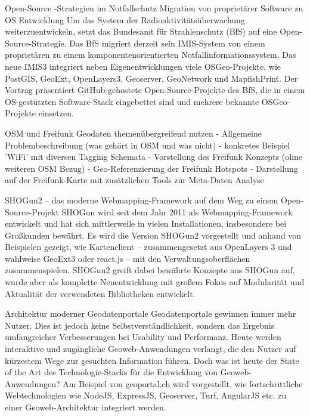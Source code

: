 %
{Open-Source -Strategien im Notfallschutz}%
{Migration von proprietärer Software zu OS Entwicklung}%
{Um das System der Radioaktivitätsüberwachung weiterzuentwickeln, setzt das Bundesamt für
Strahlenschutz (BfS) auf eine Open-Source-Strategie. Das BfS migriert derzeit sein IMIS-System von
einem proprietären zu einem komponentenorientierten Notfallinformationssystem. Das neue IMIS3
integriert neben Eigenentwicklungen viele OSGeo-Projekte, wie PostGIS, GeoExt, OpenLayers3,
Geoserver, GeoNetwork und MapfishPrint. Der Vortrag präsentiert GitHub-gehostete
Open-Source-Projekte des BfS, die in einem OS-gestützten Software-Stack eingebettet sind und mehrere
bekannte OSGeo-Projekte einsetzen.}


%
{OSM und Freifunk}%
{Geodaten themenübergreifend nutzen}%
{- Allgemeine Problembeschreibung (was gehört in OSM und was nicht)
- konkretes Beispiel 'WiFi' mit diversen Tagging Schemata
- Vorstellung des Freifunk Konzepts (ohne weiteren OSM Bezug)
- Geo-Referenzierung der Freifunk Hotspots
- Darstellung auf der Freifunk-Karte mit zusätzlichen Tools zur Meta-Daten Analyse}


%
{SHOGun2 – das moderne Webmapping-Framework}%
{auf dem Weg zu einem Open-Source-Projekt}%
{SHOGun wird seit dem Jahr 2011 als Webmapping-Framework entwickelt und hat sich mittlerweile in
  vielen Installationen, insbesondere bei Großkunden bewährt.  Es wird die Version SHOGun2
  vorgestellt und anhand von Beispielen gezeigt, wie Kartenclient --
zusammengesetzt aus OpenLayers 3 und wahlweise GeoExt3 oder react.js -- mit den
Verwaltungsoberflächen zusammenspielen.  SHOGun2 greift dabei bewährte Konzepte aus SHOGun auf,
wurde aber als komplette Neuentwicklung mit großem Fokus auf Modularität und Aktualität der
verwendeten Bibliotheken entwickelt.}


%
{Architektur moderner Geodatenportale}%
{}%
{Geodatenportale gewinnen immer mehr Nutzer. Dies ist jedoch keine Selbstverständlichkeit, sondern
das Ergebnis umfangreicher Verbesserungen bei Usability und Performanz. Heute werden interaktive und
zugängliche Geoweb-Anwendungen verlangt, die den Nutzer auf kürzestem Wege zur gesuchten Information
führen. Doch was ist heute der State of the Art des Technologie-Stacks für die Entwicklung von
Geoweb-Anwendungen? Am Beispiel von geoportal.ch wird vorgestellt, wie fortschrittliche
Webtechnologien wie NodeJS, ExpressJS, Geoserver, Turf, AngularJS etc. zu einer Geoweb-Architektur
integriert werden.}

